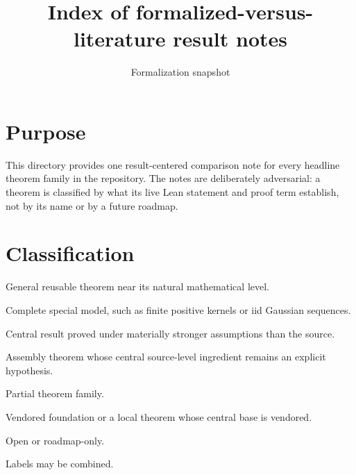 \title{Index of formalized-versus-literature result notes}
\author{}
\date{Formalization snapshot \snapshot}

\maketitle
{}
\section{Purpose}
This directory provides one result-centered comparison note for every headline theorem family in the repository.  The notes are deliberately adversarial: a theorem is classified by what its live Lean statement and proof term establish, not by its name or by a future roadmap.

\section{Classification}
\begin{description}[leftmargin=2.8em,style=nextline]
\item[G] General reusable theorem near its natural mathematical level.
\item[S] Complete special model, such as finite positive kernels or iid Gaussian sequences.
\item[R] Central result proved under materially stronger assumptions than the source.
\item[A] Assembly theorem whose central source-level ingredient remains an explicit hypothesis.
\item[P] Partial theorem family.
\item[V] Vendored foundation or a local theorem whose central base is vendored.
\item[O] Open or roadmap-only.
\end{description}
Labels may be combined.

